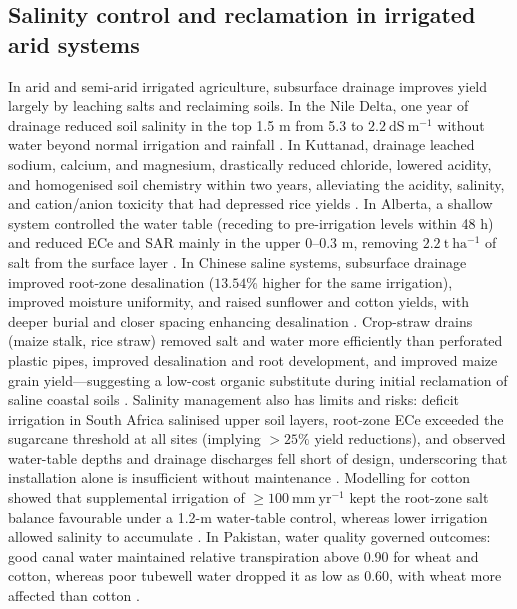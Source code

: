 \documentclass[11pt]{article}
\begin{document}
\subsection{Salinity control and reclamation in irrigated arid systems}

In arid and semi-arid irrigated agriculture, subsurface drainage improves yield largely by leaching salts and reclaiming soils. In the Nile Delta, one year of drainage reduced soil salinity in the top 1.5 m from 5.3 to \(2.2\ \mathrm{dS\ m^{-1}}\) without water beyond normal irrigation and rainfall \parencite{ELMOWELHI1988}. In Kuttanad, drainage leached sodium, calcium, and magnesium, drastically reduced chloride, lowered acidity, and homogenised soil chemistry within two years, alleviating the acidity, salinity, and cation/anion toxicity that had depressed rice yields \parencite{Mathew2001}. In Alberta, a shallow system controlled the water table (receding to pre-irrigation levels within 48 h) and reduced ECe and SAR mainly in the upper 0--0.3 m, removing \(2.2\ \mathrm{t\ ha^{-1}}\) of salt from the surface layer \parencite{BENNETT1982}. In Chinese saline systems, subsurface drainage improved root-zone desalination (\(13.54\%\) higher for the same irrigation), improved moisture uniformity, and raised sunflower and cotton yields, with deeper burial and closer spacing enhancing desalination \parencite{Zhang2024c,Yang2022,Liu2025,Guo2025}. Crop-straw drains (maize stalk, rice straw) removed salt and water more efficiently than perforated plastic pipes, improved desalination and root development, and improved maize grain yield—suggesting a low-cost organic substitute during initial reclamation of saline coastal soils \parencite{Lu2018}. Salinity management also has limits and risks: deficit irrigation in South Africa salinised upper soil layers, root-zone ECe exceeded the sugarcane threshold at all sites (implying \(>25\%\) yield reductions), and observed water-table depths and drainage discharges fell short of design, underscoring that installation alone is insufficient without maintenance \parencite{Malota2016}. Modelling for cotton showed that supplemental irrigation of \(\geq 100\ \mathrm{mm\ yr^{-1}}\) kept the root-zone salt balance favourable under a 1.2-m water-table control, whereas lower irrigation allowed salinity to accumulate \parencite{Li2018}. In Pakistan, water quality governed outcomes: good canal water maintained relative transpiration above 0.90 for wheat and cotton, whereas poor tubewell water dropped it as low as 0.60, with wheat more affected than cotton \parencite{Sarwar2001}.
\end{document}
